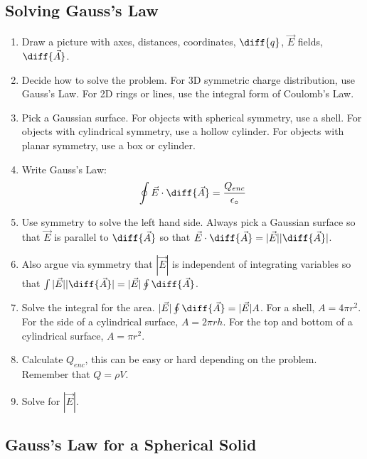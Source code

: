 \documentclass{math}
\begin{document}
\subsection*{Solving Gauss's Law}
\begin{enumerate}
  \item Draw a picture with axes, distances, coordinates, \( \diff{q} \),
  \( \vec{E} \) fields, \( \diff{\vec{A}} \).
  \item Decide how to solve the problem. For 3D symmetric charge distribution,
  use Gauss's Law. For 2D rings or lines, use the integral form of Coulomb's
  Law.
  \item Pick a Gaussian surface. For objects with spherical symmetry, use a
  shell. For objects with cylindrical symmetry, use a hollow cylinder. For
  objects with planar symmetry, use a box or cylinder.
  \item Write Gauss's Law:
  \[ \oint\vec{E}\cdot\diff{\vec{A}} = \frac{Q_{enc}}{\epsilon_{\circ}} \]
  \item Use symmetry to solve the left hand side. Always pick a Gaussian surface
  so that \( \vec{E} \) is parallel to \( \diff{\vec{A}} \) so that
  \( \vec{E}\cdot\diff{\vec{A}} = |\vec{E}||\diff{\vec{A}}| \).
  \item Also argue via symmetry that \( |\vec{E}| \) is independent of
  integrating variables so that \( \int|\vec{E}||\diff{\vec{A}}| =
  |\vec{E}|\oint\diff{\vec{A}} \).
  \item Solve the integral for the area. \( |\vec{E}|\oint\diff{\vec{A}} =
  |\vec{E}|A \). For a shell, \( A = 4\pi r^2 \). For the side of a cylindrical
  surface, \( A = 2\pi rh \). For the top and bottom of a cylindrical surface,
  \( A = \pi r^2 \).
  \item Calculate \( Q_{enc} \), this can be easy or hard depending on the
  problem. Remember that \( Q = \rho V \).
  \item Solve for \( |\vec{E}| \).
\end{enumerate}

\subsection*{Gauss's Law for a Spherical Solid}
\end{document}
